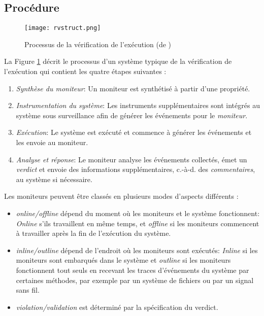 \subsection{Procédure}

\begin{figure}[h]
\begin{center}
\centering
\texttt{[image: rvstruct.png]}
\caption{Processus de la vérification de l'exécution (de \cite{falcone2013tutorial})}
\label{img:rvstruct}
\end{center}
\end{figure}

La Figure \ref{img:rvstruct} décrit le processus d'un système typique de la vérification de l'exécution qui contient les quatre étapes suivantes \citep{falcone2013tutorial}:
\begin{enumerate}
\item \emph{Synthèse du moniteur}: Un moniteur est synthétisé à partir d'une propriété.
\item \emph{Instrumentation du système}: Les instruments supplémentaires sont intégrés au système sous surveillance afin de générer les événements pour le \emph{moniteur}.
\item \emph{Exécution}: Le système est exécuté et commence à générer les événements et les envoie au moniteur.
\item \emph{Analyse et réponse}: Le moniteur analyse les événements collectés, émet un \emph{verdict} et envoie des informations supplémentaires, c.-à-d. des \emph{commentaires}, au système si nécessaire.
\end{enumerate}

Les moniteurs peuvent être classés en plusieurs modes d'aspects différents \citep{chen2007mop}:
\begin{itemize}
\item \emph{online/offline} dépend du moment où les moniteurs et le système fonctionnent: \emph{Online} s'ils travaillent en même temps, et \emph{offline} si les moniteurs commencent à travailler après la fin de l'exécution du système.
\item \emph{inline/outline} dépend de l'endroit où les moniteurs sont exécutés: \emph{Inline} si les moniteurs sont embarqués dans le système et \emph{outline} si les moniteurs fonctionnent tout seuls en recevant les traces d'événements du système par certaines méthodes, par exemple par un système de fichiers ou par un signal sans fil.
\item \emph{violation/validation} est déterminé par la spécification du verdict.
\end{itemize}

